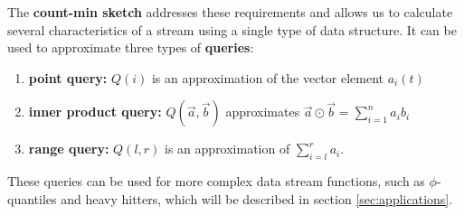\documentclass[11pt]{article}
\newcommand{\sq}{\mathit{Q}}
\begin{document}
The \textbf{count-min sketch} addresses these requirements and allows us to calculate several characteristics
of a stream using a single type of data structure.  It can be used to approximate three types of \textbf{queries}:
\begin{enumerate}
    \item \textbf{point query:} $\sq(i)$ is an approximation of the vector 
    element $a_i(t)$
    \item \textbf{inner product query:} $\sq(\vec{a}, \vec{b})$ approximates
    $\vec{a} \odot \vec{b} = \sum_{i = 1}^{n} a_i b_i$
    \item \textbf{range query:} $\sq(l, r)$ is an approximation of 
    $\sum_{i = l}^{r}a_i$. 
\end{enumerate}

These queries can be used for more complex data stream functions, such as $\phi$-quantiles and heavy hitters,
which will be described in section \ref{sec:applications}.
\end{document}
